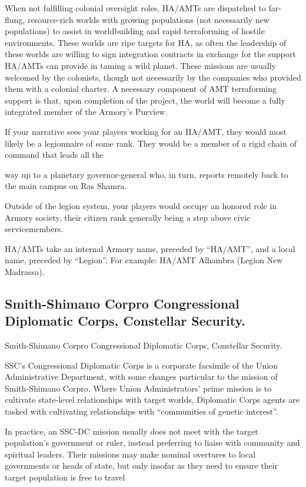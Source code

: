 When not fulfilling colonial oversight roles, HA/AMTs are dispatched to far-flung, resource-rich  
worlds with growing populations (not necessarily new populations) to assist in worldbuilding and  
rapid terraforming of hostile environments. These worlds are ripe targets for HA, as often the  
leadership of these worlds are willing to sign integration contracts in exchange for the support  
HA/AMTs can provide in taming a wild planet. These missions are usually welcomed by the  
colonists, though not necessarily by the companies who provided them with a colonial charter. A  
necessary component of AMT terraforming support is that, upon completion of the project, the  
world will become a fully integrated member of the Armory’s Purview.  
 

If your narrative sees your players working for an HA/AMT, they would most likely be a  
legionnaire of some rank. They would be a member of a rigid chain of command that leads all the  

                                                                                                          


way up to a planetary governor-general who, in turn, reports remotely back to the main campus  
on Ras Shamra. 
 

Outside of the legion system, your players would occupy an honored role in Armory society, their  
citizen rank generally being a step above civic servicemembers.
 

HA/AMTs take an internal Armory name, preceded by “HA/AMT”, and a local name, preceded by  
“Legion”. For example: HA/AMT Alhambra (Legion New Madrassa).  
 
\subsection{Smith-Shimano Corpro Congressional Diplomatic Corps, Constellar Security.}
Smith-Shimano Corpro Congressional Diplomatic Corps, Constellar  
Security.   

SSC’s Congressional Diplomatic Corps is a corporate facsimile of the Union Administrative  
Department, with some changes particular to the mission of Smith-Shimano Corpro. Where Union  
Administrators’ prime mission is to cultivate state-level relationships with target worlds, Diplomatic  
Corps agents are tasked with cultivating relationships with “communities of genetic interest”.   

In practice, an SSC-DC mission usually does not meet with the target population’s government or  
ruler, instead preferring to liaise with community and spiritual leaders. Their missions may make  
nominal overtures to local governments or heads of state, but only insofar as they need to ensure  
their target population is free to travel  

